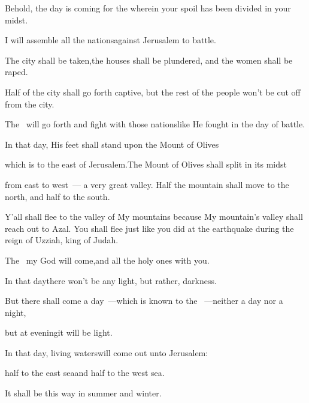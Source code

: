 
\begin{inparaenum}
  \pa{} Behold, the day is coming for the \lord\pa{}wherein your spoil has been divided in your midst.%

  \pa{} I will assemble all the nations\pa{}against Jerusalem to battle.%

  \pa{}The city shall be taken,\pa{}the houses shall be plundered,%
  \pa{}and the women shall be raped.%

  \pa{}Half of the city shall go forth captive, but the rest of the people won't be cut off from the city.%

  \pa{} The \lord\ will go forth and fight with those nations\pa{}like He fought in the day of battle.%

  \pa{} In that day, His feet shall stand upon the Mount of Olives%

  \pa{}which is to the east of Jerusalem.\pa{}The Mount of Olives shall split in its midst%

  \noindent from east to west~--- a very great valley. Half the mountain shall move to the north, and half to the south.%

  \noindent {} Y'all shall flee to the valley of My mountains because My mountain's valley shall reach out to Azal. You shall flee just like you did at the earthquake during the reign of Uzziah, king of Judah.%

  \pa{}The \lord\ my God will come,\pa{}and all the holy ones  with you.%

  \pb{} In that day\pa{}there won't be any light, but rather, darkness.%

  \pa{} But there shall come a day~---\pa{}which is known to the \lord~---\pa{}neither a day nor a night,%

  \pa{}but at evening\pa{}it will be light.%

  \pa{} In that day, living waters\pa{}will come out unto Jerusalem:%

  \pa{}half to the east sea\pa{}and half to the west sea.%

  \pa{}It shall be this way in summer and winter.%


\end{inparaenum}
